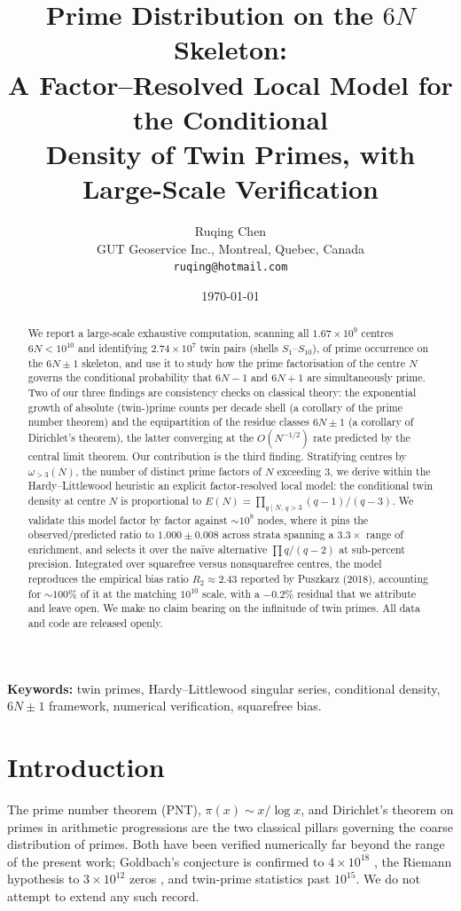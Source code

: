 \documentclass[11pt]{article}
\title{Prime Distribution on the $6N$ Skeleton:\\
A Factor--Resolved Local Model for the Conditional\\
Density of Twin Primes, with Large-Scale Verification}
\author{Ruqing Chen\\
\small GUT Geoservice Inc., Montreal, Quebec, Canada\\
\small \texttt{ruqing@hotmail.com}}
\date{\today}
\theoremstyle{definition}
\theoremstyle{remark}
\begin{document}
\maketitle

\begin{abstract}
We report a large-scale exhaustive computation, scanning all $1.67\times10^{9}$
centres $6N<10^{10}$ and identifying $2.74\times10^{7}$ twin pairs (shells
$S_1$--$S_{10}$), of prime occurrence on the $6N\pm1$ skeleton, and
use it to study how the prime factorisation of the centre $N$ governs the
conditional probability that $6N-1$ and $6N+1$ are simultaneously prime.
Two of our three findings are consistency checks on classical theory: the
exponential growth of absolute (twin-)prime counts per decade shell (a corollary
of the prime number theorem) and the equipartition of the residue classes
$6N\pm1$ (a corollary of Dirichlet's theorem), the latter converging at the
$O(N^{-1/2})$ rate predicted by the central limit theorem. Our contribution is
the third finding. Stratifying centres by $\omega_{>3}(N)$, the number of
distinct prime factors of $N$ exceeding $3$, we derive within the
Hardy--Littlewood heuristic an explicit factor-resolved local model: the
conditional twin density at centre $N$ is proportional to
$E(N)=\prod_{q\mid N,\,q>3}(q-1)/(q-3)$. We validate this model factor by factor
against $\sim\!10^8$ nodes, where it pins the observed/predicted ratio to
$1.000\pm0.008$ across strata spanning a $3.3\times$ range of enrichment, and
selects it over the na\"ive alternative $\prod q/(q-2)$ at sub-percent precision.
Integrated over squarefree versus nonsquarefree centres, the model reproduces the
empirical bias ratio $R_2\approx2.43$ reported by Puszkarz (2018), accounting for
$\sim\!100\%$ of it at the matching $10^{10}$ scale, with a $-0.2\%$ residual that we
attribute and leave open. We
make no claim bearing on the infinitude of twin primes. All data and code are
released openly.
\end{abstract}

\noindent\textbf{Keywords:} twin primes, Hardy--Littlewood singular series,
conditional density, $6N\pm1$ framework, numerical verification, squarefree bias.

\section*{Introduction}

The prime number theorem (PNT), $\pi(x)\sim x/\log x$, and Dirichlet's theorem on
primes in arithmetic progressions are the two classical pillars governing the
coarse distribution of primes. Both have been verified numerically far beyond the
range of the present work; Goldbach's conjecture is confirmed to $4\times10^{18}$
\cite{OeSilva}, the Riemann hypothesis to $3\times10^{12}$ zeros \cite{Platt}, and
twin-prime statistics past $10^{15}$. We do not attempt to extend any such record.
\end{document}
